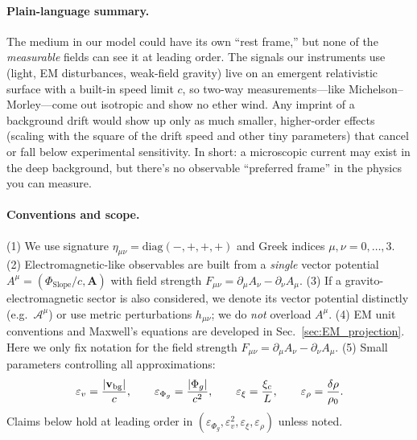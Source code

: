 \paragraph*{Plain-language summary.} The medium in our model could have its own “rest frame,” but none of the \emph{measurable} fields can see it at leading order. The signals our instruments use (light, EM disturbances, weak-field gravity) live on an emergent relativistic surface with a built-in speed limit $c$, so two-way measurements—like Michelson–Morley—come out isotropic and show no ether wind. Any imprint of a background drift would show up only as much smaller, higher-order effects (scaling with the square of the drift speed and other tiny parameters) that cancel or fall below experimental sensitivity. In short: a microscopic current may exist in the deep background, but there's no observable “preferred frame” in the physics you can measure.

\paragraph{Conventions and scope.}
(1) We use signature $\eta_{\mu\nu}=\mathrm{diag}(-,+,+,+)$ and Greek indices $\mu,\nu=0,\dots,3$.
(2) Electromagnetic-like observables are built from a \emph{single} vector potential $A^\mu=(\Phi_{\text{Slope}}/c,\mathbf A)$ with field strength $F_{\mu\nu}=\partial_\mu A_\nu-\partial_\nu A_\mu$.
(3) If a gravito-electromagnetic sector is also considered, we denote its vector potential distinctly (e.g.\ $\mathcal A^\mu$) or use metric perturbations $h_{\mu\nu}$; we do \emph{not} overload $A^\mu$.
(4) EM unit conventions and Maxwell’s equations are developed in Sec.~\ref{sec:EM_projection}. Here we only fix notation for the field strength $F_{\mu\nu}=\partial_\mu A_\nu-\partial_\nu A_\mu$.
(5) Small parameters controlling all approximations:
\begin{equation}
\varepsilon_v=\frac{|\mathbf v_{\rm bg}|}{c},\qquad
\varepsilon_{\Phi_g}=\frac{|\Phi_g|}{c^2},\qquad
\varepsilon_\xi=\frac{\xi_c}{L},\qquad
\varepsilon_\rho=\frac{\delta\rho}{\rho_0}.
\end{equation}
Claims below hold at leading order in $(\varepsilon_{\Phi_g},\varepsilon_v^2,\varepsilon_\xi,\varepsilon_\rho)$ unless noted.

